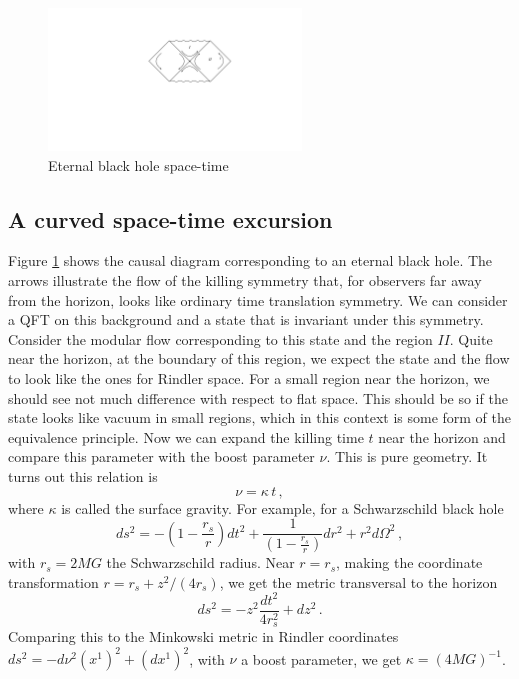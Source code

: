 \documentclass[12pt]{article}
\numberwithin{equation}{section}
\newcommand{\be}{\begin{equation}}
\newcommand{\ee}{\end{equation}}
\begin{document}
\begin{figure}[t]
\begin{center}  
\includegraphics[width=0.6\textwidth]{bh.pdf}
\captionsetup{width=0.9\textwidth}
\caption{Eternal black hole space-time}
\label{bhh}
\end{center}  
\end{figure}
\subsection{A curved space-time excursion} 
\label{curved}


Figure \ref{bhh} shows the causal diagram corresponding to an eternal black hole. The arrows illustrate the flow of the killing symmetry that, for observers far away from the horizon,  looks like ordinary time translation symmetry. We can consider a QFT on this background and a state that is invariant under this symmetry. Consider the modular flow corresponding to this state and the region $II$. Quite near the horizon, at the boundary of this region, we expect the state and the flow to look like the ones for Rindler space. For a small region near the horizon, we should see not much difference with respect to flat space.  This should be so if the state looks like vacuum in small regions, which in this context is some form of the equivalence principle. Now we can expand the killing time $t$ near the horizon and compare this parameter with the boost parameter $\nu$. This is pure geometry. It turns out this relation is
\be
\nu= \kappa\, t\,,   \label{pop}
\ee       
where $\kappa$ is called the surface gravity.  
For example, for a Schwarzschild black hole
\be
ds^2=-\left(1-\frac{r_s}{r}\right) dt^2 + \frac{1}{\left(1-\frac{r_s}{r}\right)} dr^2 +r^2 d\Omega^2\,,
\ee
with $r_s=2 M G$ the Schwarzschild radius. Near $r=r_s$, making the coordinate  transformation $r=r_s+ z^2/(4 r_s)$, we get the metric transversal to the horizon
\be
ds^2= -z^2 \frac{dt^2}{4 r_s^2}+dz^2\,. 
\ee
Comparing this to the Minkowski metric in Rindler coordinates $ds^2= - d\nu^2 (x^1)^2 + (dx^1)^2$, with $\nu$ a boost parameter, we get $\kappa=(4 M G)^{-1}$. 
\end{document}
